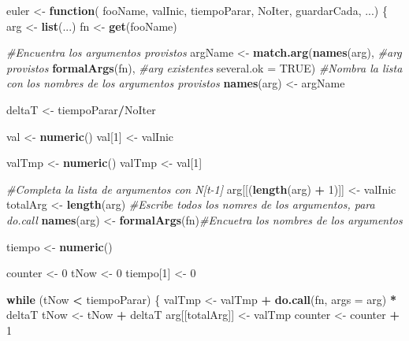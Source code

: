 \documentclass[12pt,letterpaper,]{book}
\newenvironment{Shaded}{\begin{snugshade}}{\end{snugshade}}
\newcommand{\KeywordTok}[1]{\textcolor[rgb]{0.13,0.29,0.53}{\textbf{#1}}}
\newcommand{\DataTypeTok}[1]{\textcolor[rgb]{0.13,0.29,0.53}{#1}}
\newcommand{\DecValTok}[1]{\textcolor[rgb]{0.00,0.00,0.81}{#1}}
\newcommand{\StringTok}[1]{\textcolor[rgb]{0.31,0.60,0.02}{#1}}
\newcommand{\CommentTok}[1]{\textcolor[rgb]{0.56,0.35,0.01}{\textit{#1}}}
\newcommand{\OtherTok}[1]{\textcolor[rgb]{0.56,0.35,0.01}{#1}}
\newcommand{\ControlFlowTok}[1]{\textcolor[rgb]{0.13,0.29,0.53}{\textbf{#1}}}
\newcommand{\OperatorTok}[1]{\textcolor[rgb]{0.81,0.36,0.00}{\textbf{#1}}}
\newcommand{\NormalTok}[1]{#1}
\begin{document}
\begin{Shaded}
\begin{Highlighting}[]
\NormalTok{euler <-}\StringTok{ }\ControlFlowTok{function}\NormalTok{(}
\NormalTok{          fooName,}
\NormalTok{          valInic,}
\NormalTok{          tiempoParar,}
\NormalTok{          NoIter,}
\NormalTok{          guardarCada,}
\NormalTok{                  ...) \{}
\NormalTok{  arg <-}\StringTok{ }\KeywordTok{list}\NormalTok{(...)}
\NormalTok{  fn <-}\StringTok{ }\KeywordTok{get}\NormalTok{(fooName)}

  \CommentTok{#Encuentra los argumentos provistos}
\NormalTok{  argName <-}\StringTok{ }\KeywordTok{match.arg}\NormalTok{(}\KeywordTok{names}\NormalTok{(arg), }\CommentTok{#arg provistos}
  \KeywordTok{formalArgs}\NormalTok{(fn), }\CommentTok{#arg existentes}
  \DataTypeTok{several.ok =} \OtherTok{TRUE}\NormalTok{)}
  \CommentTok{#Nombra la lista con los nombres de los argumentos provistos}
  \KeywordTok{names}\NormalTok{(arg) <-}\StringTok{ }\NormalTok{argName}
  
\NormalTok{  deltaT <-}\StringTok{ }\NormalTok{tiempoParar}\OperatorTok{/}\NormalTok{NoIter}
  
\NormalTok{  val <-}\StringTok{ }\KeywordTok{numeric}\NormalTok{()}
\NormalTok{  val[}\DecValTok{1}\NormalTok{] <-}\StringTok{ }\NormalTok{valInic}
  
\NormalTok{  valTmp <-}\StringTok{ }\KeywordTok{numeric}\NormalTok{()}
\NormalTok{  valTmp <-}\StringTok{ }\NormalTok{val[}\DecValTok{1}\NormalTok{]}
  
  \CommentTok{#Completa la lista de argumentos con N[t-1]}
\NormalTok{  arg[[(}\KeywordTok{length}\NormalTok{(arg) }\OperatorTok{+}\StringTok{ }\DecValTok{1}\NormalTok{)]] <-}\StringTok{ }\NormalTok{valInic}
\NormalTok{  totalArg <-}\StringTok{ }\KeywordTok{length}\NormalTok{(arg)}
  \CommentTok{#Escribe todos los nomres de los argumentos, para do.call}
  \KeywordTok{names}\NormalTok{(arg) <-}
\StringTok{  }\KeywordTok{formalArgs}\NormalTok{(fn)}\CommentTok{#Encuetra los nombres de los argumentos}
  
\NormalTok{  tiempo <-}\StringTok{ }\KeywordTok{numeric}\NormalTok{()}
  
\NormalTok{  counter <-}\StringTok{ }\DecValTok{0}
\NormalTok{  tNow <-}\StringTok{ }\DecValTok{0}
\NormalTok{  tiempo[}\DecValTok{1}\NormalTok{] <-}\StringTok{ }\DecValTok{0}

\ControlFlowTok{while}\NormalTok{ (tNow }\OperatorTok{<}\StringTok{ }\NormalTok{tiempoParar) \{}
\NormalTok{  valTmp <-}\StringTok{ }\NormalTok{valTmp }\OperatorTok{+}\StringTok{ }\KeywordTok{do.call}\NormalTok{(fn, }\DataTypeTok{args =}\NormalTok{ arg) }\OperatorTok{*}\StringTok{ }\NormalTok{deltaT}
\NormalTok{  tNow <-}\StringTok{ }\NormalTok{tNow }\OperatorTok{+}\StringTok{ }\NormalTok{deltaT}
\NormalTok{  arg[[totalArg]] <-}\StringTok{ }\NormalTok{valTmp}
\NormalTok{  counter <-}\StringTok{ }\NormalTok{counter }\OperatorTok{+}\StringTok{ }\DecValTok{1}


\end{Highlighting}
\end{Shaded}
\end{document}
